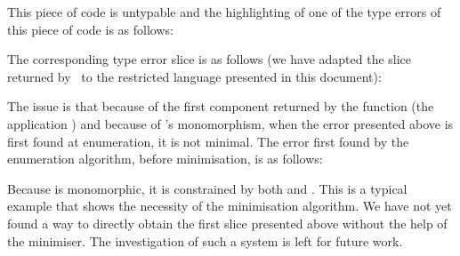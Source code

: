 \documentclass{jfp1}
\begin{document}

This piece of code is untypable and the highlighting of one of the
type errors of this piece of code is as follows:


The corresponding type error slice is as follows (we have adapted the
slice returned by \IMPLTES\ to the restricted language presented in
this document):


The issue is that because of the first component returned by the
function  (the application )
and because of 's monomorphism,
when the error presented above is first found at enumeration, it is
not minimal.  The error first found by the enumeration algorithm,
before minimisation, is as follows:


Because  is monomorphic, it is constrained by both
 and \inexamplebody{()}.  This is a typical example
that shows the necessity of the minimisation algorithm.  We have not
yet found a way to directly obtain the first slice presented above
without the help of the minimiser.  The investigation of such a
system is left for future work.





\end{document}
